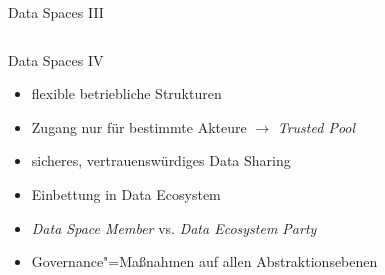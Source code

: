 \begin{frame}{Data Spaces III \footnotesize\cite{mollerIndustrialDataEcosystems2024}}
\begin{columns}
        \begin{column}{0.4\textwidth}
        \end{column}
    \end{columns}
\end{frame}


\begin{frame}{Data Spaces IV \footnotesize\cite{mollerIndustrialDataEcosystems2024}}
    \begin{itemize}
        \item flexible betriebliche Strukturen
        \item Zugang nur für bestimmte Akteure $\to$ \emph{Trusted Pool}
        \item sicheres, vertrauenswürdiges Data Sharing
        
        \pause
        \item Einbettung in Data Ecosystem
        \item \emph{Data Space Member} vs. \emph{Data Ecosystem Party}
        
        \pause
        \item Governance"=Maßnahmen auf allen Abstraktionsebenen
    \end{itemize}
    
\end{frame}
